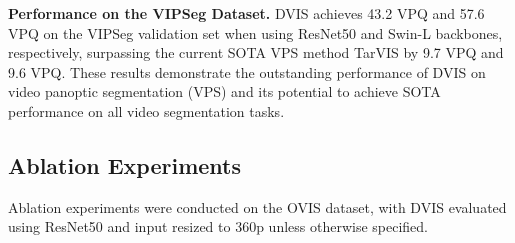 \documentclass[10pt,twocolumn,letterpaper]{article}
\begin{document}
\textbf{Performance on the VIPSeg Dataset.} DVIS achieves 43.2 VPQ and 57.6 VPQ on the VIPSeg validation set when using ResNet50 and Swin-L backbones, respectively, surpassing the current SOTA VPS method TarVIS \cite{tarvis} by 9.7 VPQ and 9.6 VPQ. These results demonstrate the outstanding performance of DVIS on video panoptic segmentation (VPS) and its potential to achieve SOTA performance on all video segmentation tasks.

\subsection{Ablation Experiments}\label{sec:ablation}
Ablation experiments were conducted on the OVIS dataset, with DVIS evaluated using ResNet50 and input resized to 360p unless otherwise specified.
\end{document}
